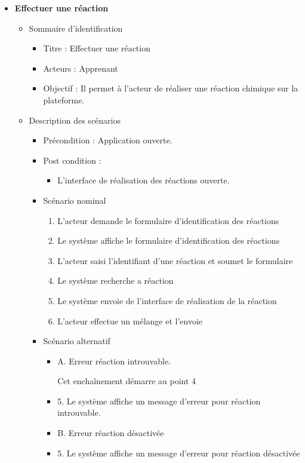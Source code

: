 \begin{itemize}
	\item \textbf{Effectuer une réaction}
	\begin{itemize}
		\item Sommaire d’identification
		\begin{itemize}
			\item Titre : Effectuer une réaction
			\item Acteurs : Apprenant 
			\item Objectif : Il permet à l’acteur de réaliser une réaction chimique sur la plateforme.
		\end{itemize}
		\item Description des scénarios
		\begin{itemize}
			\item Précondition : Application ouverte.
			\item Post condition :
			\begin{itemize}
				\item L'interface de réalisation des réactions ouverte.
			\end{itemize}
			\item Scénario nominal 
			\begin{enumerate}
				\item L’acteur demande le formulaire d'identification des réactions  
				\item Le système affiche le formulaire d'identification des réactions
				\item L’acteur saisi l'identifiant d'une réaction et soumet le formulaire 
				\item Le système recherche a réaction 
				\item Le système envoie de l'interface de réalisation de la réaction 
				\item L’acteur effectue un mélange et l’envoie 
			\end{enumerate}
			\item Scénario alternatif
			\begin{itemize}
				\item A. Erreur réaction introuvable.
				
				Cet enchaînement démarre au point 4 

				\item 5.  Le système affiche un message d’erreur pour réaction introuvable.
				\item B. Erreur réaction désactivée 
				\item 5. Le système affiche un message d’erreur pour réaction désactivée 
			\end{itemize}
		\end{itemize}
	\end{itemize}


\end{itemize}
